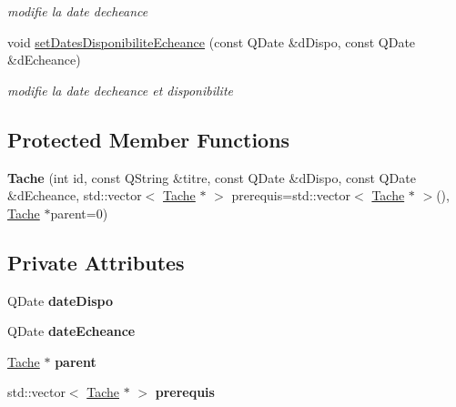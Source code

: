 \begin{DoxyCompactItemize}
\begin{DoxyCompactList}\small\item\em modifie la date d\textquotesingle{}echeance \end{DoxyCompactList}\item 
void \hyperlink{class_tache_a40fdf3048f276628904c5da0c971e314}{set\+Dates\+Disponibilite\+Echeance} (const Q\+Date \&d\+Dispo, const Q\+Date \&d\+Echeance)
\begin{DoxyCompactList}\small\item\em modifie la date d\textquotesingle{}echeance et disponibilite \end{DoxyCompactList}\end{DoxyCompactItemize}
\subsection*{Protected Member Functions}
\begin{DoxyCompactItemize}
\item 
\hypertarget{class_tache_aefe43451eb0c8140f5bfab7b376ef4fe}{}{\bfseries Tache} (int id, const Q\+String \&titre, const Q\+Date \&d\+Dispo, const Q\+Date \&d\+Echeance, std\+::vector$<$ \hyperlink{class_tache}{Tache} $\ast$ $>$ prerequis=std\+::vector$<$ \hyperlink{class_tache}{Tache} $\ast$ $>$(), \hyperlink{class_tache}{Tache} $\ast$parent=0)\label{class_tache_aefe43451eb0c8140f5bfab7b376ef4fe}

\end{DoxyCompactItemize}
\subsection*{Private Attributes}
\begin{DoxyCompactItemize}
\item 
\hypertarget{class_tache_ac8758b826b1be639dad8bcb556659a36}{}Q\+Date {\bfseries date\+Dispo}\label{class_tache_ac8758b826b1be639dad8bcb556659a36}

\item 
\hypertarget{class_tache_a7671c127da40ae35075f069a64396f45}{}Q\+Date {\bfseries date\+Echeance}\label{class_tache_a7671c127da40ae35075f069a64396f45}

\item 
\hypertarget{class_tache_a272b3f2cf7cba4a1a7980063563f8b88}{}\hyperlink{class_tache}{Tache} $\ast$ {\bfseries parent}\label{class_tache_a272b3f2cf7cba4a1a7980063563f8b88}

\item 
\hypertarget{class_tache_ae1f847bb410d1c0b4c252d7add695ddf}{}std\+::vector$<$ \hyperlink{class_tache}{Tache} $\ast$ $>$ {\bfseries prerequis}\label{class_tache_ae1f847bb410d1c0b4c252d7add695ddf}

\end{DoxyCompactItemize}


